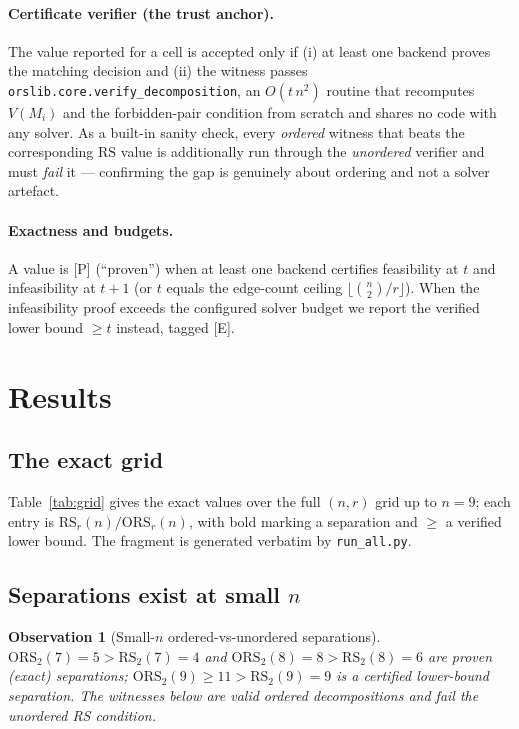 \documentclass[11pt]{article}
\newcommand{\statusP}{\textsf{\footnotesize[P]}}
\newcommand{\statusE}{\textsf{\footnotesize[E]}}
\newcommand{\RS}{\mathrm{RS}}
\newcommand{\ORS}{\mathrm{ORS}}
\newtheorem{observation}{Observation}
\begin{document}
\paragraph{Certificate verifier (the trust anchor).} The value reported for a
cell is accepted only if (i) at least one backend proves the matching
decision and (ii) the witness passes
\texttt{orslib.core.verify\_decomposition}, an $O(t\,n^2)$ routine that
recomputes $V(M_i)$ and the forbidden-pair condition from scratch and shares
no code with any solver. As a built-in sanity check, every \emph{ordered}
witness that beats the corresponding $\RS$ value is additionally run through
the \emph{unordered} verifier and must \emph{fail} it --- confirming the gap
is genuinely about ordering and not a solver artefact.

\paragraph{Exactness and budgets.} A value is \statusP{} (``proven'') when at
least one backend certifies feasibility at $t$ and infeasibility at $t+1$
(or $t$ equals the edge-count ceiling $\lfloor\binom n2/r\rfloor$). When the
infeasibility proof exceeds the configured solver budget we report the
verified lower bound $\ge t$ instead, tagged \statusE.

\section{Results}\label{sec:results}

\subsection{The exact grid}

Table~\ref{tab:grid} gives the exact values over the full $(n,r)$ grid up to
$n=9$; each entry is $\RS_r(n)/\ORS_r(n)$, with bold marking a separation and
$\ge$ a verified lower bound. The fragment is generated verbatim by
\texttt{run\_all.py}.



\subsection{Separations exist at small $n$}\label{sec:sep}

\begin{observation}[Small-$n$ ordered-vs-unordered separations]\label{obs:sep}
$\ORS_2(7)=5>\RS_2(7)=4$ and $\ORS_2(8)=8>\RS_2(8)=6$ are proven (exact)
separations; $\ORS_2(9)\ge 11>\RS_2(9)=9$ is a certified lower-bound
separation. The witnesses below are valid ordered decompositions and fail the
unordered RS condition.
\end{observation}
\end{document}
